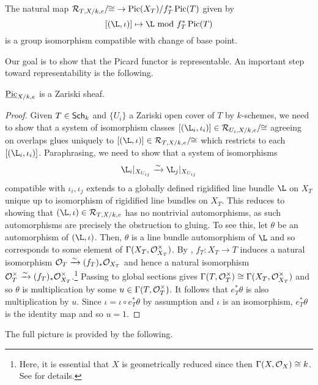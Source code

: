 \documentclass[11pt]{article}
\begin{document}
\begin{proposition}\label{concrete_Picard}
The natural map $\mathcal{R}_{T,X/k,e}/\!\!\cong\;\to\operatorname{Pic}(X_T)/f_T^*\operatorname{Pic}(T)$ given by 
$$[(\L,\iota)]\mapsto\L\textrm{ mod }f_T^*\Pic(T)$$ 
is a group isomorphism compatible with change of base point.
\end{proposition}

Our goal is to show that the Picard functor is representable. An important step toward representability is the following.
 
\begin{theorem}\label{Picard_Zariski_Thm}
$\underline{\operatorname{Pic}}_{X/k,e}$ is a Zariski sheaf.
\end{theorem}

\begin{proof}
Given $T\in\operatorname{\mathsf{Sch}}_k$ and $\{U_i\}$ a Zariski open cover of $T$ by $k$-schemes, we need to show that a system of isomorphism classes $[(\L_i,\iota_i)]\in\mc{R}_{U_i,X/k,e}/\!\!\iso$ agreeing on overlaps glues uniquely to $[(\L,\iota)]\in\mc{R}_{T,X/k,e}/\!\!\iso$ which restricts to each $[(\L_i,\iota_i)]$. Paraphrasing, we need to show that a system of isomorphisms
$$\L_i|_{X_{U_{ij}}}\xto{\sim}\L_j|_{X_{U_{ij}}}$$
compatible with $\iota_i,\iota_j$ extends to a globally defined rigidified line bundle $\L$ on $X_T$ unique up to isomorphism of rigidified line bundles on $X_T$. This reduces to showing that $(\L,\iota)\in\mc{R}_{T,X/k,e}$ has no nontrivial automorphisms, as such automorphisms are precisely the obstruction to gluing. To see this, let $\theta$ be an automorphism of $(\L,\iota)$. Then, $\theta$ is a line bundle automorphism of $\L$ and so corresponds to some element of $\Gamma(X_T,\mathcal{O}_{X_T}^{\times})$. By \cite[\textrm{Lemma 2.2.1}]{Conrad}, $f_T: X_T\to T$ induces a natural isomorphism $\mathcal{O}_T\xrightarrow{\sim}(f_T)_*\mathcal{O}_{X_T}$ and hence a natural isomorphism $\mathcal{O}_T^{\times}\xrightarrow{\sim}(f_T)_*\mathcal{O}_{X_T}^{\times}$.\footnote{Here, it is essential that $X$ is geometrically reduced since then $\Gamma(X,\mathcal{O}_X)\cong k$. See \cite[\textrm{Tag 0366}]{Stack} for details.} Passing to global sections gives $\Gamma(T,\mathcal{O}_T^{\times})\cong\Gamma(X_T,\mathcal{O}_{X_T}^{\times})$ and so $\theta$ is multiplication by some $u\in\Gamma(T,\mathcal{O}_T^{\times})$. It follows that $e_T^*\theta$ is also multiplication by $u$. Since $\iota=\iota\circ e_T^*\theta$ by assumption and $\iota$ is an isomorphism, $e_T^*\theta$ is the identity map and so $u=1$.
\end{proof}

The full picture is provided by the following.
\end{document}
